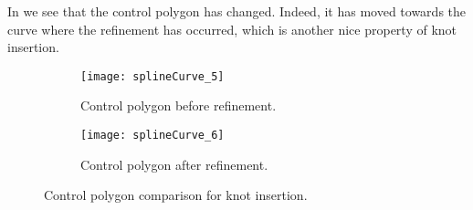 In  we see that the control polygon has changed. Indeed, it has moved towards the curve where the refinement has occurred, which is another nice property of knot insertion.
\begin{figure}
        \centering        
        \begin{subfigure}{0.49\textwidth}
       		\centering
			\texttt{[image: splineCurve\_5]}
            \caption{Control polygon before refinement.}
        \end{subfigure}%
        \hspace*{0.02\textwidth}%
        \begin{subfigure}{0.49\textwidth}
       		\centering
			\texttt{[image: splineCurve\_6]}
            \caption{Control polygon after refinement.}
        \end{subfigure}
        \caption{Control polygon comparison for knot insertion.}\label{Fig:splineCurveRefined2}
\end{figure}

